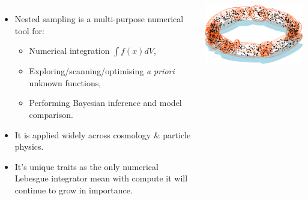 \documentclass[aspectratio=169,handout]{beamer}
\begin{document}
\begin{frame}
    \vspace{-0.1\textheight}
    \begin{columns}
    \begin{itemize}
        \item Nested sampling is a multi-purpose numerical tool for:
            \begin{itemize}
                \item Numerical integration $\int f(x) dV$,
                \item Exploring/scanning/optimising \textit{a priori} unknown functions,
                \item Performing Bayesian inference and model comparison.
            \end{itemize}
        \item It is applied widely across cosmology \& particle physics.
        \item It's unique traits as the only numerical Lebesgue integrator mean with compute it will continue to grow in importance.
    \end{itemize}
    \includegraphics[width=\textwidth]{figures/multinest}


\end{columns}
\end{frame}
\end{document}
